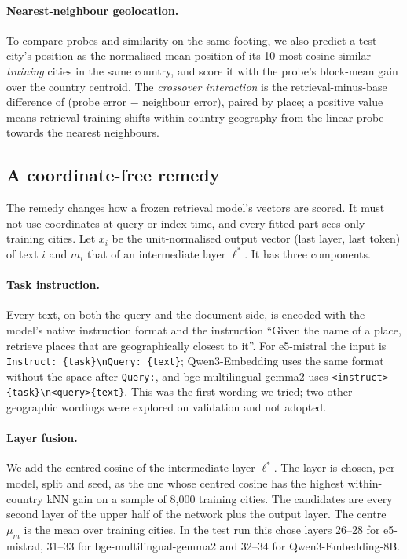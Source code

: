 \paragraph{Nearest-neighbour geolocation.}
To compare probes and similarity on the same footing, we also predict a test city's position as the normalised mean position of its 10 most cosine-similar \emph{training} cities in the same country, and score it with the probe's block-mean gain over the country centroid. The \emph{crossover interaction} is the retrieval-minus-base difference of (probe error $-$ neighbour error), paired by place; a positive value means retrieval training shifts within-country geography from the linear probe towards the nearest neighbours.

\subsection{A coordinate-free remedy}
\label{sec:method-fix}

The remedy changes how a frozen retrieval model's vectors are scored. It must not use coordinates at query or index time, and every fitted part sees only training cities. Let $x_i$ be the unit-normalised output vector (last layer, last token) of text $i$ and $m_i$ that of an intermediate layer $\ell^\ast$. It has three components.

\paragraph{Task instruction.}
Every text, on both the query and the document side, is encoded with the model's native instruction format and the instruction ``Given the name of a place, retrieve places that are geographically closest to it''. For e5-mistral the input is \texttt{Instruct: \{task\}\textbackslash nQuery: \{text\}}; Qwen3-Embedding uses the same format without the space after \texttt{Query:}, and bge-multilingual-gemma2 uses \texttt{<instruct>\{task\}\textbackslash n<query>\{text\}}. This was the first wording we tried; two other geographic wordings were explored on validation and not adopted.

\paragraph{Layer fusion.}
We add the centred cosine of the intermediate layer $\ell^\ast$. The layer is chosen, per model, split and seed, as the one whose centred cosine has the highest within-country kNN gain on a sample of 8,000 training cities. The candidates are every second layer of the upper half of the network plus the output layer. The centre $\mu_m$ is the mean over training cities. In the test run this chose layers 26--28 for e5-mistral, 31--33 for bge-multilingual-gemma2 and 32--34 for Qwen3-Embedding-8B.


